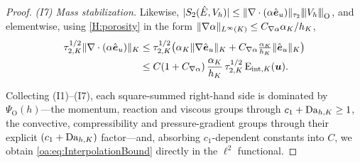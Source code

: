 \begin{proof}
\smallskip\noindent
\emph{(I7) Mass stabilization.} Likewise,
$|S_2(\hat E, V_h)| \le
\lVert \nabla\cdot(\alpha\hat{\boldsymbol e}_u) \rVert_{\tau_2}{\lvert\kern-0.25ex\lvert\kern-0.25ex\lvert V_h \rvert\kern-0.25ex\rvert\kern-0.25ex\rvert}_{\mathrm{O}}$, and elementwise,
using \cref{H:porosity} in the form $\lVert \nabla\alpha \rVert_{L^\infty(K)} \le C_{\nabla\alpha}\alpha_K/h_K$,
\[
\begin{aligned}
  \tau_{2,K}^{1/2}\lVert \nabla\cdot(\alpha\hat{\boldsymbol e}_u) \rVert_K
  &\le \tau_{2,K}^{1/2}\bigl( \alpha_K \lVert \nabla\hat{\boldsymbol e}_u \rVert_K
  + C_{\nabla\alpha}\tfrac{\alpha_K}{h_K}\lVert \hat{\boldsymbol e}_u \rVert_K \bigr) \\
  &\le C(1+C_{\nabla\alpha})\,\frac{\alpha_K}{h_K}\,\tau_{2,K}^{1/2}\,\mathrm{E}_{\mathrm{int},K}(\boldsymbol{u}).
\end{aligned}
\]

Collecting (I1)--(I7), each square-summed right-hand side is dominated by
$\Psi_{\mathrm O}(h)$---the momentum, reaction and viscous groups through
$c_1+\mathrm{Da}_{h,K} \ge 1$, the convective, compressibility and pressure-gradient groups through their explicit
$(c_1+\mathrm{Da}_{h,K})$ factor---and, absorbing $c_1$-dependent constants into $C$, we obtain
\cref{oa:eq:InterpolationBound} directly in the $\ell^2$ functional.
\end{proof}

